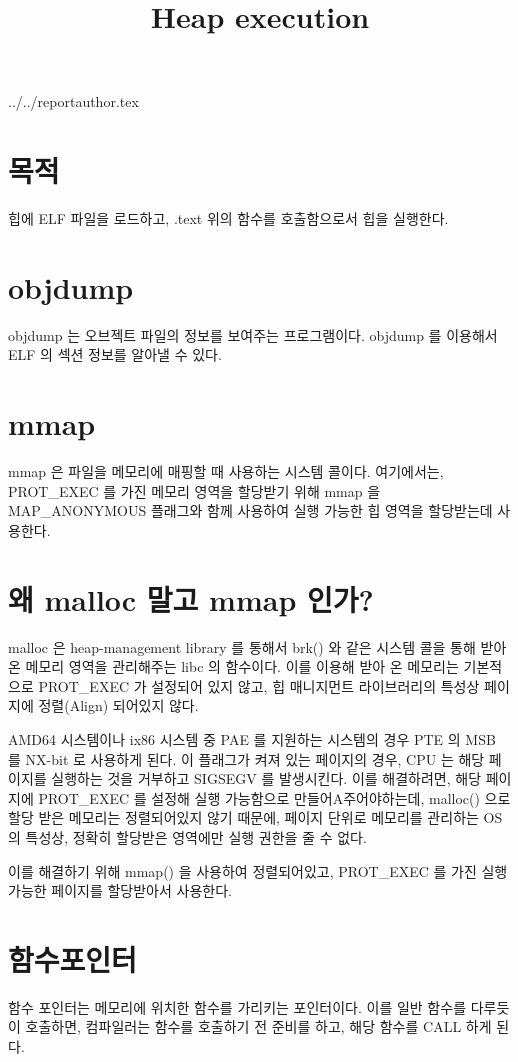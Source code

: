 \documentclass {article}
\begin{document}
\title {Heap execution}
 {../../reportauthor.tex}
\maketitle

\section{목적}
힙에 ELF 파일을 로드하고, .text 위의 함수를 호출함으로서 힙을 실행한다.

\section{objdump}
objdump 는 오브젝트 파일의 정보를 보여주는 프로그램이다. objdump 를 이용해서 ELF 의 섹션 정보를 알아낼 수 있다.

\section{mmap}
mmap 은 파일을 메모리에 매핑할 때 사용하는 시스템 콜이다. 여기에서는, PROT\_EXEC 를 가진 메모리 영역을 할당받기 위해 mmap 을 MAP\_ANONYMOUS 플래그와 함께 사용하여 실행 가능한 힙 영역을 할당받는데 사용한다.

\section{왜 malloc 말고 mmap 인가?}
malloc 은 heap-management library 를 통해서 brk() 와 같은 시스템 콜을 통해 받아온 메모리
영역을 관리해주는 libc 의 함수이다. 이를 이용해 받아 온 메모리는 기본적으로 PROT\_EXEC 가
설정되어 있지 않고, 힙 매니지먼트 라이브러리의 특성상 페이지에 정렬(Align) 되어있지 않다.

AMD64 시스템이나 ix86 시스템 중 PAE 를 지원하는 시스템의 경우 PTE 의 MSB 를 NX-bit 로 사용하게 된다. 이 플래그가 켜져 있는 페이지의 경우, CPU 는 해당 페이지를 실행하는 것을 거부하고 SIGSEGV 를 발생시킨다. 이를 해결하려면, 해당 페이지에 PROT\_EXEC 를 설정해 실행 가능함으로 만들어A주어야하는데, malloc() 으로 할당 받은 메모리는 정렬되어있지 않기 때문에, 페이지 단위로 메모리를 관리하는 OS의 특성상, 정확히 할당받은 영역에만 실행 권한을 줄 수 없다.

이를 해결하기 위해 mmap() 을 사용하여 정렬되어있고, PROT\_EXEC 를 가진 실행 가능한 페이지를 할당받아서 사용한다.

\section{함수포인터}
함수 포인터는 메모리에 위치한 함수를 가리키는 포인터이다. 이를 일반 함수를 다루듯이 호출하면, 컴파일러는 함수를 호출하기 전 준비를 하고, 해당 함수를 CALL 하게 된다.
\end{document}
